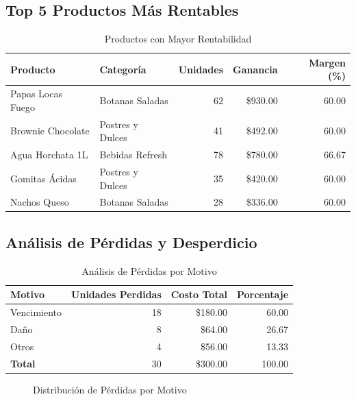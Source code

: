 \documentclass[12pt,a4paper]{article}
\begin{document}
\subsection{Top 5 Productos Más Rentables}
\begin{table}[h!]
\centering
\caption{Productos con Mayor Rentabilidad}
\begin{tabular}{|l|l|r|r|r|}
\hline
\textbf{Producto} & \textbf{Categoría} & \textbf{Unidades} & \textbf{Ganancia} & \textbf{Margen (\%)} \\
\hline
Papas Locas Fuego & Botanas Saladas & 62 & \$930.00 & 60.00 \\
Brownie Chocolate & Postres y Dulces & 41 & \$492.00 & 60.00 \\
Agua Horchata 1L & Bebidas Refresh & 78 & \$780.00 & 66.67 \\
Gomitas Ácidas & Postres y Dulces & 35 & \$420.00 & 60.00 \\
Nachos Queso & Botanas Saladas & 28 & \$336.00 & 60.00 \\
\hline
\end{tabular}
\end{table}

\subsection{Análisis de Pérdidas y Desperdicio}
\begin{table}[h!]
\centering
\caption{Análisis de Pérdidas por Motivo}
\begin{tabular}{|l|r|r|r|}
\hline
\textbf{Motivo} & \textbf{Unidades Perdidas} & \textbf{Costo Total} & \textbf{Porcentaje} \\
\hline
Vencimiento & 18 & \$180.00 & 60.00 \\
Daño & 8 & \$64.00 & 26.67 \\
Otros & 4 & \$56.00 & 13.33 \\
\hline
\textbf{Total} & 30 & \$300.00 & 100.00 \\
\hline
\end{tabular}
\end{table}

\begin{figure}[h!]
\centering
{}
\caption{Distribución de Pérdidas por Motivo}
\end{figure}
\end{document}

